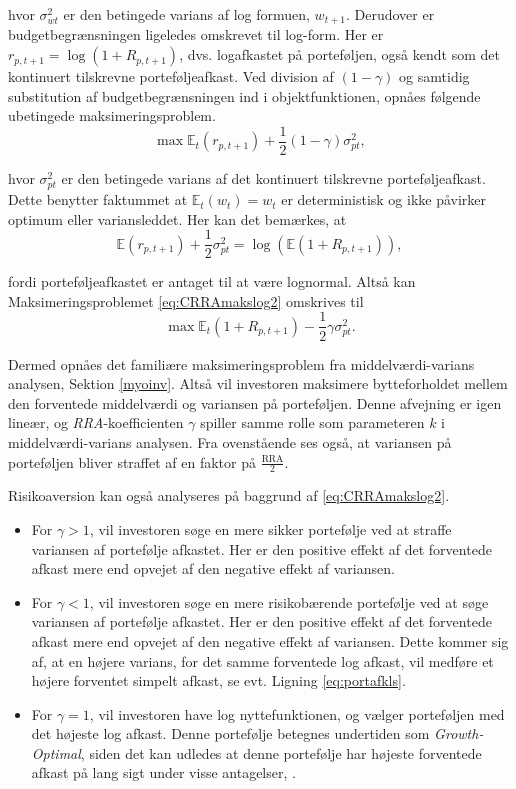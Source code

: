 \documentclass[
  a4paper,
  oneside]{memoir}
\begin{document}
hvor \(\sigma_{wt}^2\) er den betingede varians af log formuen, \(w_{t+1}\). Derudover er budgetbegrænsningen ligeledes omskrevet til log-form. Her er \(r_{p,t+1}=\log(1+R_{p,t+1})\), dvs. logafkastet på porteføljen, også kendt som det kontinuert tilskrevne porteføljeafkast. Ved division af \((1-\gamma)\) og samtidig substitution af budgetbegrænsningen ind i objektfunktionen, opnåes følgende ubetingede maksimeringsproblem.
\begin{equation}
\max\mathbb{E}_t(r_{p,t+1}) + \frac{1}{2}(1-\gamma)\sigma_{pt}^2, \label{eq:CRRAmakslog2}
\end{equation}

hvor \(\sigma_{pt}^2\) er den betingede varians af det kontinuert tilskrevne porteføljeafkast. Dette benytter faktummet at \(\mathbb{E}_t(w_t)=w_t\) er deterministisk og ikke påvirker optimum eller variansleddet. Her kan det bemærkes, at
\begin{equation}
\mathbb{E}(r_{p,t+1})+\frac{1}{2}\sigma_{pt}^2=\log(\mathbb{E}(1+R_{p,t+1})), \label{eq:portafkls}
\end{equation}

fordi porteføljeafkastet er antaget til at være lognormal. Altså kan Maksimeringsproblemet \eqref{eq:CRRAmakslog2} omskrives til
\begin{equation}
\max\mathbb{E}_t(1+R_{p,t+1}) - \frac{1}{2}\gamma\sigma_{pt}^2. \label{eq:CRRAmakslog3}
\end{equation}

Dermed opnåes det familiære maksimeringsproblem fra middelværdi-varians analysen, Sektion \ref{myoinv}. Altså vil investoren maksimere bytteforholdet mellem den forventede middelværdi og variansen på porteføljen. Denne afvejning er igen lineær, og \emph{RRA}-koefficienten \(\gamma\) spiller samme rolle som parameteren \(k\) i middelværdi-varians analysen. Fra ovenstående ses også, at variansen på porteføljen bliver straffet af en faktor på \(\tfrac{\text{RRA}}{2}\).

Risikoaversion kan også analyseres på baggrund af \eqref{eq:CRRAmakslog2}.

\begin{itemize}
\item
  For \(\gamma>1\), vil investoren søge en mere sikker portefølje ved at straffe variansen af portefølje afkastet. Her er den positive effekt af det forventede afkast mere end opvejet af den negative effekt af variansen.
\item
  For \(\gamma<1\), vil investoren søge en mere risikobærende portefølje ved at søge variansen af portefølje afkastet. Her er den positive effekt af det forventede afkast mere end opvejet af den negative effekt af variansen. Dette kommer sig af, at en højere varians, for det samme forventede log afkast, vil medføre et højere forventet simpelt afkast, se evt. Ligning \eqref{eq:portafkls}.
\item
  For \(\gamma=1\), vil investoren have log nyttefunktionen, og vælger porteføljen med det højeste log afkast. Denne portefølje betegnes undertiden som \emph{Growth-Optimal}, siden det kan udledes at denne portefølje har højeste forventede afkast på lang sigt under visse antagelser, \citep{Kelly1956}.
\end{itemize}
\end{document}
